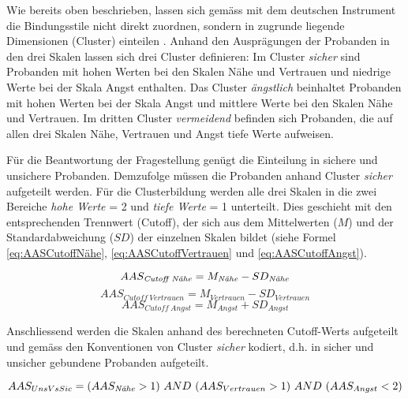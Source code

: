 Wie bereits oben beschrieben, lassen sich gemäss  mit dem deutschen Instrument die Bindungsstile nicht direkt zuordnen, sondern in zugrunde liegende Dimensionen (Cluster) einteilen \cite{Schuetzmann2004}. Anhand den Ausprägungen der Probanden in den drei Skalen lassen sich drei Cluster definieren: Im Cluster \textit{sicher} sind Probanden mit hohen Werten bei den Skalen Nähe und Vertrauen und niedrige Werte bei der Skala Angst enthalten. Das Cluster \textit{ängstlich} beinhaltet Probanden mit hohen Werten bei der Skala Angst und mittlere Werte bei den Skalen Nähe und Vertrauen. Im dritten Cluster \textit{vermeidend} befinden sich Probanden, die auf allen drei Skalen Nähe, Vertrauen und Angst tiefe Werte aufweisen.

Für die Beantwortung der Fragestellung genügt die Einteilung in sichere und unsichere Probanden. Demzufolge müssen die Probanden anhand Cluster \textit{sicher} aufgeteilt werden. 
Für die Clusterbildung werden alle drei Skalen in die zwei Bereiche \textit{hohe Werte} = 2 und \textit{tiefe Werte} = 1 unterteilt. Dies geschieht mit den entsprechenden Trennwert (Cutoff), der sich aus dem Mittelwerten ($M$) und der Standardabweichung ($SD$) der einzelnen Skalen bildet (siehe Formel \ref{eq:AASCutoffNähe}, \ref{eq:AASCutoffVertrauen} und \ref{eq:AASCutoffAngst}).

\begin{equation}\label{eq:AASCutoffNähe}
    AAS_{\text{\textit{Cutoff~N{\"a}he}}}=M_{\text{\textit{N{\"a}he}}} - SD_{\text{\textit{N{\"a}he}}}
\end{equation}
\begin{equation}\label{eq:AASCutoffVertrauen}
    AAS_{Cutoff~Vertrauen}=M_{Vertrauen} - SD_{Vertrauen}
\end{equation}
\begin{equation}\label{eq:AASCutoffAngst}
    AAS_{Cutoff~Angst}=M_{Angst} + SD_{Angst}
\end{equation}

Anschliessend werden die Skalen anhand des berechneten Cutoff-Werts aufgeteilt und gemäss den Konventionen von Cluster \textit{sicher} kodiert, d.h. in sicher und unsicher gebundene Probanden aufgeteilt.

\begin{equation}\label{eq:AASSicherVsUnsicher}
    AAS_{UnsVsSic}=( AAS_{\text{\textit{N{\"a}he}}} > 1) ~AND~ (AAS_{Vertrauen} > 1) ~AND~ (AAS_{Angst} < 2)
\end{equation}

